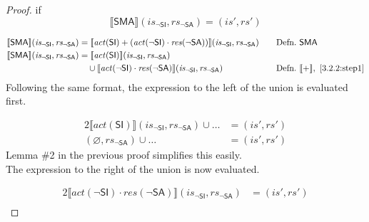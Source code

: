 \documentclass[12pt, letterpaper]{article}
\let\emptyset\varnothing
\newcommand\interp[1]{\llbracket #1 \rrbracket}
\begin{document}
 \begin{proof}
 if
     \[
     \interp{ \mathsf{SMA} } (\mathit{is_{\mathsf{\neg SI}}}, \mathit{rs_{\mathsf{\neg SA}}})
     =
     (\mathit{is}', \mathit{rs}')
     \]
 \par\nobreak
 {\fontsize{10pt}{12pt}\selectfont
 \begin{alignat}{2}
     \setcounter{equation}{0}
     \label{3.2.2:step1}
     \interp{ \mathsf{SMA} } (\mathit{is_{\mathsf{\neg SI}}}, \mathit{rs_{\mathsf{\neg SA}}})
     &=
     \interp{ \mathit{act}(\mathsf{SI}) +
     (\mathit{act}(\neg\mathsf{SI}) \cdot
      \mathit{res}(\neg\mathsf{SA}))  } (\mathit{is_{\mathsf{\neg SI}}}, \mathit{rs_{\mathsf{\neg SA}}})
     &&\quad \text{Defn.}\ \mathsf{SMA}
     \\
     \label{3.2.2:step2}
     \interp{ \mathsf{SMA} } (\mathit{is_{\mathsf{\neg SI}}}, \mathit{rs_{\mathsf{\neg SA}}})
     &=
     \interp{ \mathit{act}(\mathsf{SI}) } (\mathit{is_{\mathsf{\neg SI}}}, \mathit{rs_{\mathsf{\neg SA}}}) \\
     &\quad \cup %
     \interp{ \mathit{act}(\neg\mathsf{SI}) \cdot
      \mathit{res}(\neg\mathsf{SA}) } (\mathit{is_{\mathsf{\neg SI}}}, \mathit{rs_{\mathsf{\neg SA}}})
     &&\quad \text{Defn.}\ \interp{+},\ \ref{3.2.2:step1}
 \end{alignat}
 }%
     Following the same format, the expression to the left of the union is evaluated first.
 \par\nobreak
 {\fontsize{10pt}{12pt}\selectfont
 \begin{alignat}{2}
     \interp{ \mathit{act}(\mathsf{SI}) } (\mathit{is_{\mathsf{\neg SI}}}, \mathit{rs_{\mathsf{\neg SA}}}) \cup \ldots
     &=
     (\mathit{is}', \mathit{rs}')
     \\
     (\emptyset, \mathit{rs_{\mathsf{\neg SA}}}) \cup \ldots
     &=
     (\mathit{is}', \mathit{rs}')
 \end{alignat}
 }%
     Lemma \#2 in the previous proof simplifies this easily.\\
     The expression to the right of the union is now evaluated.
 \par\nobreak
 {\fontsize{10pt}{12pt}\selectfont
 \begin{alignat}{2}
     \interp{ \mathit{act}(\neg\mathsf{SI}) \cdot
      \mathit{res}(\neg\mathsf{SA}) } (\mathit{is_{\mathsf{\neg SI}}}, \mathit{rs_{\mathsf{\neg SA}}})
     &=
     (\mathit{is}', \mathit{rs}')
     \\

\end{alignat}}
\end{proof}
\end{document}
